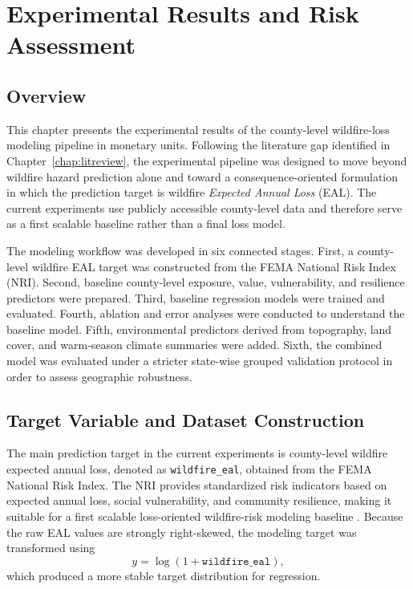 \chapter{Experimental Results and Risk Assessment}
\label{chap:results}

\section{Overview}

This chapter presents the experimental results of the county-level wildfire-loss modeling pipeline in monetary units. Following the literature gap identified in Chapter~\ref{chap:litreview}, the experimental pipeline was designed to move beyond wildfire hazard prediction alone and toward a consequence-oriented formulation in which the prediction target is wildfire \emph{Expected Annual Loss} (EAL). The current experiments use publicly accessible county-level data and therefore serve as a first scalable baseline rather than a final loss model.

The modeling workflow was developed in six connected stages. First, a county-level wildfire EAL target was constructed from the FEMA National Risk Index (NRI). Second, baseline county-level exposure, value, vulnerability, and resilience predictors were prepared. Third, baseline regression models were trained and evaluated. Fourth, ablation and error analyses were conducted to understand the baseline model. Fifth, environmental predictors derived from topography, land cover, and warm-season climate summaries were added. Sixth, the combined model was evaluated under a stricter state-wise grouped validation protocol in order to assess geographic robustness.

\section{Target Variable and Dataset Construction}

The main prediction target in the current experiments is county-level wildfire expected annual loss, denoted as \texttt{wildfire\_eal}, obtained from the FEMA National Risk Index. The NRI provides standardized risk indicators based on expected annual loss, social vulnerability, and community resilience, making it suitable for a first scalable loss-oriented wildfire-risk modeling baseline \citep{fema2025nri_technical,fema2025nri_methodology}. Because the raw EAL values are strongly right-skewed, the modeling target was transformed using
\[
y = \log(1 + \texttt{wildfire\_eal}),
\]
which produced a more stable target distribution for regression.

